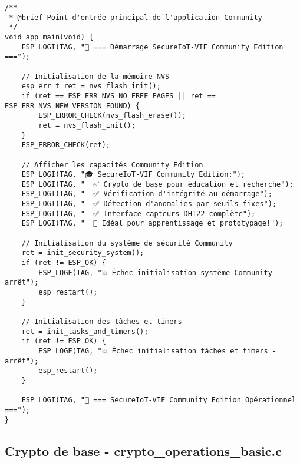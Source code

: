 \begin{lstlisting}[caption={Fonction principale SecureIoT-VIF Community}]
/**
 * @brief Point d'entrée principal de l'application Community
 */
void app_main(void) {
    ESP_LOGI(TAG, "🚀 === Démarrage SecureIoT-VIF Community Edition ===");
    
    // Initialisation de la mémoire NVS
    esp_err_t ret = nvs_flash_init();
    if (ret == ESP_ERR_NVS_NO_FREE_PAGES || ret == ESP_ERR_NVS_NEW_VERSION_FOUND) {
        ESP_ERROR_CHECK(nvs_flash_erase());
        ret = nvs_flash_init();
    }
    ESP_ERROR_CHECK(ret);
    
    // Afficher les capacités Community Edition
    ESP_LOGI(TAG, "🎓 SecureIoT-VIF Community Edition:");
    ESP_LOGI(TAG, "  ✅ Crypto de base pour éducation et recherche");
    ESP_LOGI(TAG, "  ✅ Vérification d'intégrité au démarrage");
    ESP_LOGI(TAG, "  ✅ Détection d'anomalies par seuils fixes");
    ESP_LOGI(TAG, "  ✅ Interface capteurs DHT22 complète");
    ESP_LOGI(TAG, "  🎯 Idéal pour apprentissage et prototypage!");
    
    // Initialisation du système de sécurité Community
    ret = init_security_system();
    if (ret != ESP_OK) {
        ESP_LOGE(TAG, "💥 Échec initialisation système Community - arrêt");
        esp_restart();
    }
    
    // Initialisation des tâches et timers
    ret = init_tasks_and_timers();
    if (ret != ESP_OK) {
        ESP_LOGE(TAG, "💥 Échec initialisation tâches et timers - arrêt");
        esp_restart();
    }
    
    ESP_LOGI(TAG, "🎉 === SecureIoT-VIF Community Edition Opérationnel ===");
}
\end{lstlisting}

\subsection{Crypto de base - crypto\_operations\_basic.c}

